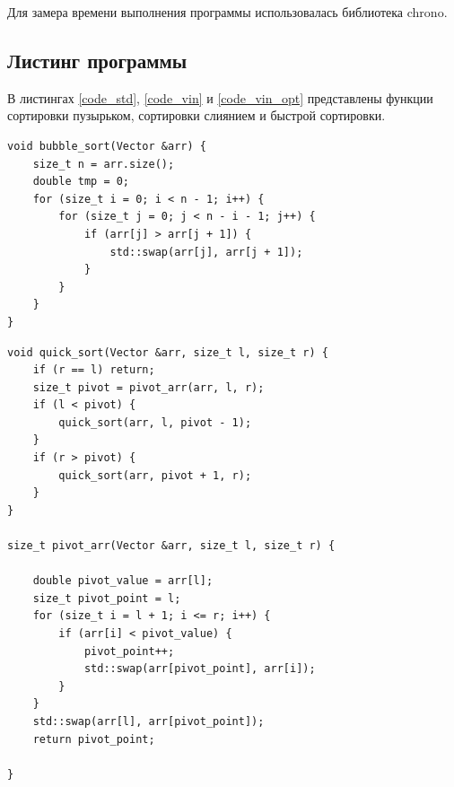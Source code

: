 \documentclass[a4paper,12pt]{article}
\begin{document}
	Для замера времени выполнения программы использовалась библиотека chrono.
	

    
    \subsection{Листинг программы}
	В листингах \ref{code_std},  \ref{code_vin} и \ref{code_vin_opt} представлены функции сортировки пузырьком, сортировки слиянием и быстрой сортировки.
	
	\begin{center}
	\begin{lstlisting}[label=code_std, caption={Сортировка пузырьком}]
void bubble_sort(Vector &arr) {
    size_t n = arr.size();
    double tmp = 0;
    for (size_t i = 0; i < n - 1; i++) {
        for (size_t j = 0; j < n - i - 1; j++) {
            if (arr[j] > arr[j + 1]) {
                std::swap(arr[j], arr[j + 1]);
            }
        }
    }
}

    \end{lstlisting}
    \end{center}  

     
	\begin{lstlisting}[label=code_vin, caption={Быстрая сортировка}]
void quick_sort(Vector &arr, size_t l, size_t r) {
    if (r == l) return;
    size_t pivot = pivot_arr(arr, l, r);
    if (l < pivot) {
        quick_sort(arr, l, pivot - 1);
    }
    if (r > pivot) {
        quick_sort(arr, pivot + 1, r);
    }
}

size_t pivot_arr(Vector &arr, size_t l, size_t r) {

    double pivot_value = arr[l];
    size_t pivot_point = l;
    for (size_t i = l + 1; i <= r; i++) {
        if (arr[i] < pivot_value) {
            pivot_point++;
            std::swap(arr[pivot_point], arr[i]);
        }
    }
    std::swap(arr[l], arr[pivot_point]);
    return pivot_point;

}
\end{lstlisting}
\end{document}
